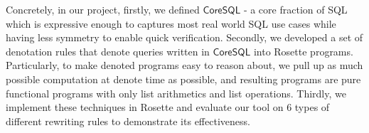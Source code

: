 Concretely, in our project, firstly, we defined $\mathsf{CoreSQL}$ - a core fraction of SQL which is expressive enough to captures most real world SQL use cases while having less symmetry to enable quick verification. Secondly, we developed a set of denotation rules that denote queries written in $\mathsf{CoreSQL}$ into Rosette programs. Particularly, to make denoted programs easy to reason about, we pull up as much possible computation at denote time as possible, and resulting programs are pure functional programs with only list arithmetics and list operations. Thirdly, we implement these techniques in Rosette and evaluate our tool on 6 types of different rewriting rules to demonstrate its effectiveness.